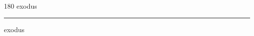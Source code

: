 
\begin{frame}
\begin{center}
\begin{turn}{180}
{\fontsize{2.5cm}{1em}\selectfont exodus}
\end{turn}
\vspace{1em}\par  
\hrule
\vspace{1em}\par  
{\fontsize{2.5cm}{1em}\selectfont exodus}
\end{center}
\end{frame}
